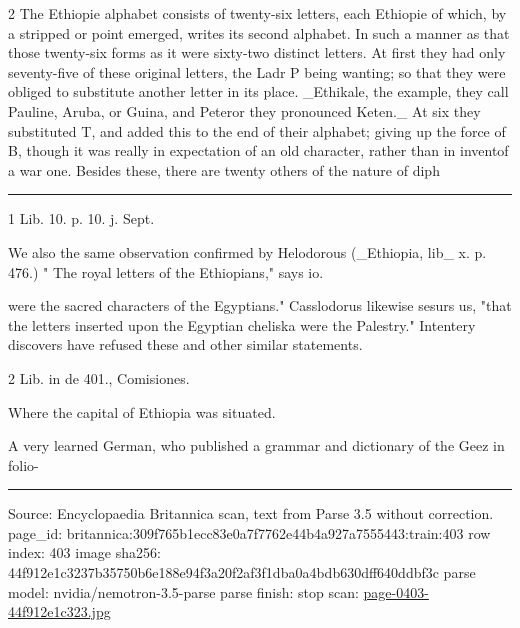 \documentclass[10pt]{article}
\begin{document}
\begin{multicols}{2}
The Ethiopie alphabet consists of twenty-six letters, each Ethiopie of which, by a stripped or point emerged, writes its second alphabet. In such a manner as that those twenty-six forms as it were sixty-two distinct letters. At first they had only seventy-five of these original letters, the Ladr P being wanting; so that they were obliged to substitute another letter in its place. \_Ethikale, the example, they call Pauline, Aruba, or Guina, and Peteror they pronounced Keten.\_ At six they substituted T, and added this to the end of their alphabet; giving up the force of B, though it was really in expectation of an old character, rather than in inventof a war one. Besides these, there are twenty others of the nature of diph

\end{multicols}
\par\vspace{4pt}\noindent\rule{0.3\linewidth}{0.4pt}\par
{\footnotesize
1 Lib. 10. p. 10. j. Sept.

We also the same observation confirmed by Helodorous (\_Ethiopia, lib\_ x. p. 476.) " The royal letters of the Ethiopians," says io.

were the sacred characters of the Egyptians." Casslodorus likewise sesurs us, "that the letters inserted upon the Egyptian cheliska were the Palestry." Intentery discovers have refused these and other similar statements.

2 Lib. in de 401., Comisiones.

Where the capital of Ethiopia was situated.

A very learned German, who published a grammar and dictionary of the Geez in folio-\par}
\vfill\par\noindent\rule{\linewidth}{0.4pt}\par
{\scriptsize\color{gray}\noindent Source: Encyclopaedia Britannica scan, text from Parse 3.5 without correction. page\_id: britannica:309f765b1ecc83e0a7f7762e44b4a927a7555443:train:403 \quad row index: 403 \quad image sha256: 44f912e1c3237b35750b6e188e94f3a20f2af3f1dba0a4bdb630dff640ddbf3c \quad parse model: nvidia/nemotron-3.5-parse \quad parse finish: stop \quad scan: \href{../scans/page-0403-44f912e1c323.jpg}{page-0403-44f912e1c323.jpg}\par}
\end{document}
